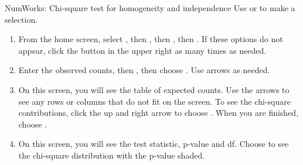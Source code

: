 \begin{onebox}{NumWorks: Chi-square test for homogeneity and independence}
\label{normalnumworks}
Use  or  to make a selection.
\begin{enumerate}
\setlength{\itemsep}{0mm}
\item From the home screen, select , then , then , then .  If these options do not appear, click the \calcbutton{$\lhookleftarrow$} button in the upper right as many times as needed. 
\item Enter the observed counts, then \calctext{$\alpha$}, then choose .  Use arrows as needed.
\item On this screen, you will see the table of expected counts.  Use the arrows to see any rows or columns that do not fit on the screen. To see the chi-square contributions, click the up and right arrow to choose .  When you are finished, choose .
\begin{center}
\hspace{10mm}
\end{center}
\item On this screen, you will see the test statistic, p-value and df.  Choose  to see the chi-square distribution with the p-value shaded.  
\begin{center}
\hspace{10mm}
\end{center}
\vspace{-1.5mm}
\end{enumerate}
\end{onebox}

\newpage


